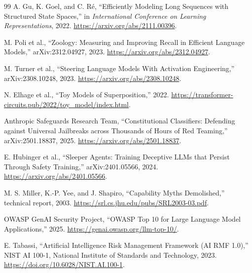 \documentclass[11pt]{article}
\begin{document}
\begin{thebibliography}{99}
A. Gu, K. Goel, and C. Ré, ``Efficiently Modeling Long Sequences with Structured State Spaces,'' in \emph{International Conference on Learning Representations}, 2022. \url{https://arxiv.org/abs/2111.00396}.

M. Poli et al., ``Zoology: Measuring and Improving Recall in Efficient Language Models,'' arXiv:2312.04927, 2023. \url{https://arxiv.org/abs/2312.04927}.

M. Turner et al., ``Steering Language Models With Activation Engineering,'' arXiv:2308.10248, 2023. \url{https://arxiv.org/abs/2308.10248}.

N. Elhage et al., ``Toy Models of Superposition,'' 2022. \url{https://transformer-circuits.pub/2022/toy_model/index.html}.

Anthropic Safeguards Research Team, ``Constitutional Classifiers: Defending against Universal Jailbreaks across Thousands of Hours of Red Teaming,'' arXiv:2501.18837, 2025. \url{https://arxiv.org/abs/2501.18837}.

E. Hubinger et al., ``Sleeper Agents: Training Deceptive LLMs that Persist Through Safety Training,'' arXiv:2401.05566, 2024. \url{https://arxiv.org/abs/2401.05566}.

M. S. Miller, K.-P. Yee, and J. Shapiro, ``Capability Myths Demolished,'' technical report, 2003. \url{https://srl.cs.jhu.edu/pubs/SRL2003-03.pdf}.

OWASP GenAI Security Project, ``OWASP Top 10 for Large Language Model Applications,'' 2025. \url{https://genai.owasp.org/llm-top-10/}.

E. Tabassi, ``Artificial Intelligence Risk Management Framework (AI RMF 1.0),'' NIST AI 100-1, National Institute of Standards and Technology, 2023. \url{https://doi.org/10.6028/NIST.AI.100-1}.
\end{thebibliography}
\end{document}
